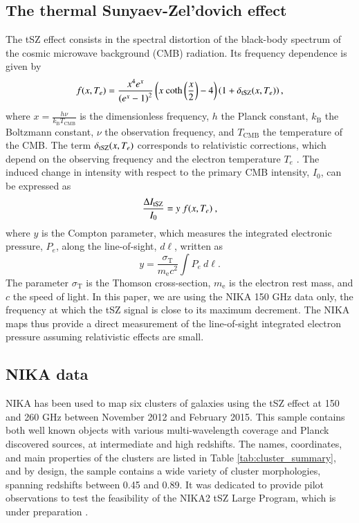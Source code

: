 \documentclass[traditabstract]{aa}
\begin{document}
\subsection{The thermal Sunyaev-Zel'dovich effect}
The tSZ effect consists in the spectral distortion of the black-body spectrum of the cosmic microwave background (CMB) radiation. Its frequency dependence is given by \citep{birkinshaw1999}
\begin{equation}
        f(x, T_e) = \frac{x^4 e^x}{\left(e^x-1\right)^2} \left(x \ \mathrm{coth}\left(\frac{x}{2}\right) - 4\right) \left(1 + \delta_{\rm tSZ}(x, T_e) \right),
        \label{eq:sz_f_x}
\end{equation}
where $x = \frac{h \nu}{k_{\mathrm{B}} T_{\mathrm{CMB}}}$ is the dimensionless frequency, $h$ the Planck constant, $k_{\mathrm{B}}$ the Boltzmann constant, $\nu$ the observation frequency, and $T_{\mathrm{CMB}}$ the temperature of the CMB. The term $\delta_{\rm tSZ}(x,T_e)$ corresponds to relativistic corrections, which depend on the observing frequency and the electron temperature $T_e$ \citep[see, e.g.,][]{Itoh2003}. The induced change in intensity with respect to the primary CMB intensity, $I_0$, can be expressed as
\begin{equation}
        \frac{\Delta I_{\rm tSZ}}{I_0} = y \ f(x, T_e) \ ,
\label{eq:deltaI}
\end{equation}
where $y$ is the Compton parameter, which measures the integrated electronic pressure, $P_{e}$, along the line-of-sight, $d\ell$, written as
   \begin{equation}
        y = \frac{\sigma_{\mathrm{T}}}{m_{\mathrm{e}} c^2} \int P_{e} \ d\ell.
        \label{eq:y_compton}
   \end{equation}
The parameter $\sigma_{\mathrm{T}}$ is the Thomson cross-section, $m_{\mathrm{e}}$ is the electron rest mass, and $c$ the speed of light. In this paper, we are using the NIKA 150 GHz data only, the frequency at which the tSZ signal is close to its maximum decrement. The NIKA maps thus provide a direct measurement of the line-of-sight integrated electron pressure assuming relativistic effects are small.

\subsection{NIKA data}\label{sec:NIKA_Data}
NIKA has been used to map six clusters of galaxies using the tSZ effect at 150 and 260 GHz between November 2012 and February 2015. This sample contains both well known objects with various multi-wavelength coverage and Planck discovered sources, at intermediate and high redshifts. The names, coordinates, and main properties of the clusters are listed in Table \ref{tab:cluster_summary}, and by design, the sample contains a wide variety of cluster morphologies, spanning redshifts between 0.45 and 0.89. It was dedicated to provide pilot observations to test the feasibility of the NIKA2 \citep{NIKA2017} tSZ Large Program, which is under preparation \citep{Comis2016,Mayet2017}. 
\end{document}
